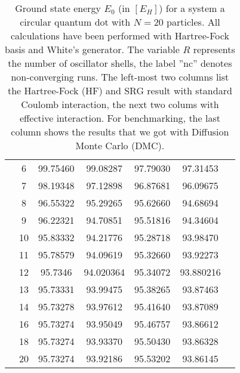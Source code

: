 \begin{table}
\begin{center}
\begin{tabular}{|c|c|c|c|c|c|c|}
& 6&99.75460 &99.08287 &97.79030 &97.31453 & \\
& 7&98.19348 &97.12898 &96.87681 &96.09675 & \\
& 8&96.55322 &95.29265 &95.62660 &94.68694 & \\
& 9&96.22321 &94.70851 &95.51816 &94.34604 & \\
& 10&95.83332 &94.21776 &95.28718 &93.98470 & \\
& 11&95.78579 &94.09619 & 95.32660 &93.92273 & \\
& 12&95.7346 &94.020364 & 95.34072 & 93.880216& \\
& 13&95.73331 &93.99475 &95.38265 & 93.87463 & \\
&14 &95.73278 &93.97612 &95.41640 &93.87089 & \\
&16 &95.73274 &93.95049 &95.46757 &93.86612 & \\
& 18&95.73274 & 93.93370&95.50430 &  93.86328& \\
& 20&95.73274 &93.92186 &95.53202 &93.86145 & \\
\hline
\end{tabular}
\end{center}
\caption{Ground state energy $E_0$ (in $\left[E_H\right]$) for a system a circular quantum dot with $N=20$ particles. All calculations have been performed with Hartree-Fock basis and White's generator. The variable $R$ represents the number of oscillator shells, the label ''nc'' denotes non-converging runs. The left-most two columns list the Hartree-Fock (HF) and SRG result with standard Coulomb interaction, the next two colums with effective interaction.
For benchmarking, the last column shows the results that we got with Diffusion Monte Carlo (DMC).}
\label{tab:fulltab6}
\end{table}


